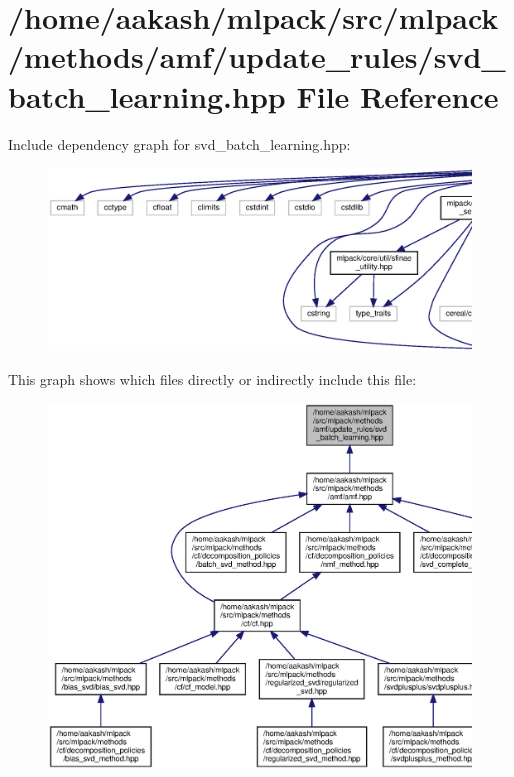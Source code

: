 \section{/home/aakash/mlpack/src/mlpack/methods/amf/update\+\_\+rules/svd\+\_\+batch\+\_\+learning.hpp File Reference}
\label{svd__batch__learning_8hpp}
Include dependency graph for svd\+\_\+batch\+\_\+learning.\+hpp\+:
\nopagebreak
\begin{figure}[H]
\begin{center}
\leavevmode
\includegraphics[width=350pt]{svd__batch__learning_8hpp__incl}
\end{center}
\end{figure}
This graph shows which files directly or indirectly include this file\+:
\nopagebreak
\begin{figure}[H]
\begin{center}
\leavevmode
\includegraphics[width=350pt]{svd__batch__learning_8hpp__dep__incl}
\end{center}
\end{figure}
